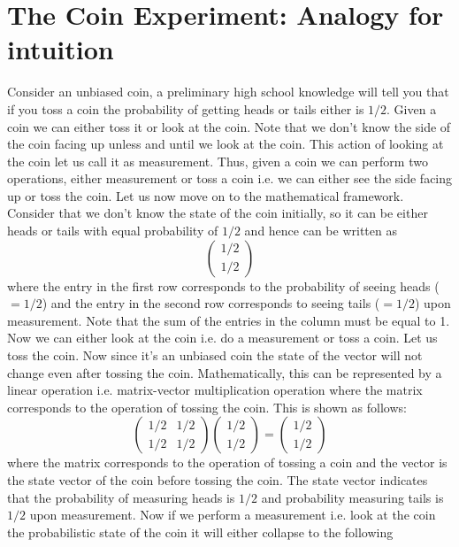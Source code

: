 \documentclass[12pt, oneside]{book}
\theoremstyle{definition}
\theoremstyle{definition}
\theoremstyle{remark}
\begin{document}
\section{The Coin Experiment: Analogy for intuition}
Consider an unbiased coin, a preliminary high school knowledge will tell you that if you toss a coin the probability of getting heads or tails either is $1/2$. Given a coin we can either toss it or look at the coin. Note that we don't know the side of the coin facing up unless and until we look at the coin. This action of looking at the coin let us call it as measurement. Thus, given a coin we can perform two operations, either measurement or toss a coin i.e. we can either see the side facing up or toss the coin. Let us now move on to the mathematical framework. Consider that we don't know the state of the coin initially, so it can be either heads or tails with equal probability of $1/2$ and hence can be written as
\[
\begin{pmatrix} 1/2 \\ 1/2 \end{pmatrix}
\]
where the entry in the first row corresponds to the probability of seeing heads ($=1/2$) and the entry in the second row corresponds to seeing tails ($=1/2$) upon measurement. Note that the sum of the entries in the column must be equal to 1. Now we can either look at the coin i.e. do a measurement or toss a coin. Let us toss the coin. Now since it's an unbiased coin the state of the vector will not change even after tossing the coin. Mathematically, this can be represented by a linear operation i.e. matrix-vector multiplication operation where the matrix corresponds to the operation of tossing the coin. This is shown as follows:
\[
\begin{pmatrix} 1/2 & 1/2 \\ 1/2 & 1/2 \end{pmatrix} \begin{pmatrix} 1/2 \\ 1/2 \end{pmatrix} = \begin{pmatrix} 1/2 \\ 1/2 \end{pmatrix}
\]
where the matrix corresponds to the operation of tossing a coin and the vector is the state vector of the coin before tossing the coin. The state vector indicates that the probability of measuring heads is $1/2$ and probability measuring tails is $1/2$ upon measurement. Now if we perform a measurement i.e. look at the coin the probabilistic state of the coin it will either collapse to the following
\end{document}

